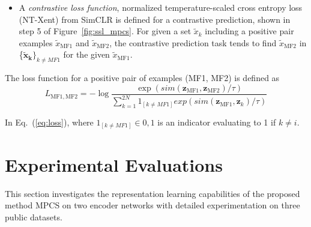 \documentclass[conference]{IEEEtran}
\begin{document}
\begin{itemize}
    \item A \textit{contrastive loss function}, normalized temperature-scaled cross entropy loss (NT-Xent) from SimCLR is defined for a contrastive prediction, shown in step 5 of Figure~\ref{fig:ssl_mpcs}.
    For given a set \textbf{$\tilde{x}_{k}$} including a positive pair examples \textbf{$\tilde{x}_\mathrm{MF1}$} and \textbf{$\tilde{x}_\mathrm{MF2}$}, the contrastive prediction task tends to find \textbf{$\tilde{x}_\mathrm{MF2}$} in \{${\mathbf{\tilde{x}_{k}}}\}_{k\neq MF1}$ for the given \textbf{$\tilde{x}_\mathrm{MF1}$}.
\end{itemize}

The loss function for a positive pair of examples (MF1, MF2) is defined as
\begin{equation}
    L_\mathrm{MF1,MF2} = -\log \dfrac{\exp(sim(\boldsymbol{z}_\mathrm{MF1},\boldsymbol{z}_\mathrm{MF2})/\tau)} {\sum_{k =1}^{2N} 1_{[k \neq MF1]} exp(sim(\boldsymbol{z}_\mathrm{MF1},\boldsymbol{z}_{k})/\tau)}
\label{eq:loss}
\end{equation}
\begin{comment}

\begin{equation}
   sim(\boldsymbol{z}_\mathrm{MF1},\boldsymbol{z}_\mathrm{MF2}) = \dfrac{\boldsymbol{z}^T_\mathrm{MF1}  \boldsymbol{z}_\mathrm{MF2}} {\parallel sim(\boldsymbol{z}_\mathrm{MF1}) \parallel \parallel sim(\boldsymbol{z}_\mathrm{MF2}) \parallel}
   \vspace{-1em}
\end{equation}

\begin{equation}
   sim(\boldsymbol{z}_\mathrm{MF1},\boldsymbol{z}_{k}) = \dfrac{\boldsymbol{z}^T_\mathrm{MF1}  \boldsymbol{z}_{k}} {\parallel sim(\boldsymbol{z}_\mathrm{MF1}) \parallel \parallel sim(\boldsymbol{z}_{k}) \parallel}
\end{equation}
\end{comment}

In Eq.~(\ref{eq:loss}), where $1_{[k \neq MF1]} \in {0, 1}$ is an indicator evaluating to 1 if $k \neq i$.











  \label{methdology}



\section{Experimental Evaluations}
This section investigates the representation learning capabilities of the proposed method MPCS on two encoder networks with detailed experimentation on three public datasets.
\end{document}
